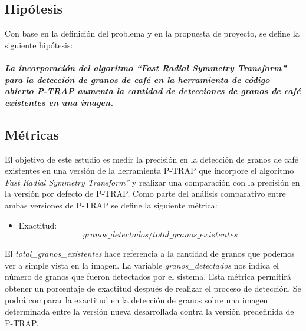 \subsection{Hip\'otesis}
Con base en la definici\'on del problema y en la propuesta de proyecto, se define la siguiente hip\'otesis:\\\\
\textbf{\textit{La incorporaci\'on del algoritmo “Fast Radial Symmetry Transform”\cite{loyzelinsky} para la detecci\'on de granos de caf\'e en la herramienta de c\'odigo abierto P-TRAP\cite{ptrap} aumenta la cantidad de detecciones de granos de caf\'e existentes en una imagen.}} 
\subsection{M\'etricas} \label{metricas}
El objetivo de este estudio es medir la precisi\'on en la detecci\'on de granos de caf\'e existentes en una versi\'on de la herramienta P-TRAP\cite{ptrap} que incorpore el algoritmo \textit{Fast Radial Symmetry Transform”}\cite{loyzelinsky} y realizar una comparaci\'on con la precisi\'on en la versi\'on por defecto de P-TRAP\cite{ptrap}. Como parte del an\'alisis comparativo entre ambas versiones de P-TRAP\cite{ptrap} se define la siguiente m\'etrica:
\begin{itemize}
\item Exactitud: \[ granos\_detectados / total\_granos\_existentes \]
\end{itemize}

El \textit{total\_granos\_existentes} hace referencia a la cantidad de granos que podemos ver a simple vista en la imagen. La variable \textit{granos\_detectados} nos indica el n\'umero de granos que fueron detectados por el sistema. Esta m\'etrica permitir\'a obtener un porcentaje de exactitud despu\'es de realizar el proceso de detecci\'on. Se podr\'a comparar la exactitud en la detecci\'on de granos sobre una imagen determinada entre la versi\'on nueva desarrollada contra la versi\'on predefinida de P-TRAP\cite{ptrap}.


